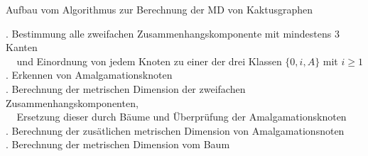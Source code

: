 \begin{algorithm}
\caption{Aufbau vom Algorithmus zur Berechnung der MD von Kaktusgraphen}
\begin{algorithmic}
\vspace{2mm}
\vspace{2mm}
\vspace{2mm}
. Bestimmung alle zweifachen Zusammenhangskomponente mit mindestens 3 Kanten\\$\;\;\;\;$und Einordnung von jedem Knoten zu einer der drei Klassen $\{0,i,A\}$ mit $i \geq 1$\\
\vspace{2mm}
. Erkennen von Amalgamationsknoten\\
\vspace{2mm}
. Berechnung der metrischen Dimension der zweifachen Zusammenhangskomponenten,\\$\;\;\;\;$Ersetzung dieser durch Bäume und Überprüfung der Amalgamationsknoten\\
\vspace{2mm}
. Berechnung der zusätlichen metrischen Dimension von Amalgamationsnoten\\
\vspace{2mm}
. Berechnung der metrischen Dimension vom Baum
\vspace{2mm}
\end{algorithmic}
\end{algorithm}
\newpage

